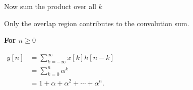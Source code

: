 \documentclass[aspectratio=169,11pt]{beamer}
\newcommand{\CardTitleSize}{\large}
\newcommand{\CardTitle}[1]{%
  \vspace{0.15cm}
  {\CardTitleSize\bfseries #1}\par
}
\begin{document}
\begin{frame}{Now sum the product over all \(k\)}

\begin{GreenBox}[
  calloutshadedgreen,
  fontupper=\large,
  halign=center
]{}
Only the overlap region contributes to the convolution sum.
\end{GreenBox}

\vspace{0.12cm}

\begin{center}
\begin{OrangeCard}[width=0.88\textwidth,halign=center,top=12pt,bottom=12pt]
\CardTitle{For \(n\ge 0\)}

\vspace{0.08cm}

\(
\begin{aligned}
y[n]
&=
\sum_{k=-\infty}^{\infty}x[k]h[n-k]\\[3pt]
&=
\sum_{k=0}^{n}\alpha^k\\[3pt]
&=
1+\alpha+\alpha^2+\cdots+\alpha^n.
\end{aligned}
\)



\end{OrangeCard}
\end{center}

\end{frame}
\end{document}
